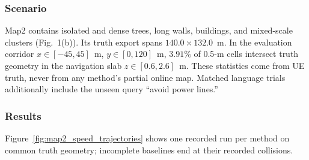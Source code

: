 \documentclass[letterpaper,10pt,conference]{ieeeconf}
\begin{document}
\begin{table}[t]
\caption{Fixed Parameters Used by the Current Implementation}
\label{tab:params}
\centering
\small
{}
\end{table}

\subsubsection{Scenario}
Map2 contains isolated and dense trees, long walls, buildings, and
mixed-scale clusters (Fig.~1(b)).  Its truth export spans
$140.0\times132.0$~m.  In the evaluation corridor $x\in[-45,45]$~m,
$y\in[0,120]$~m, $3.91\%$ of 0.5-m cells intersect truth geometry in the
navigation slab $z\in[0.6,2.6]$~m.  These statistics come from UE truth,
never from any method's partial online map.  Matched language trials
additionally include the unseen query ``avoid power lines.''

\subsubsection{Results}
Figure~\ref{fig:map2_speed_trajectories} shows one recorded run per method on
common truth geometry; incomplete baselines end at their recorded collisions.
\end{document}

